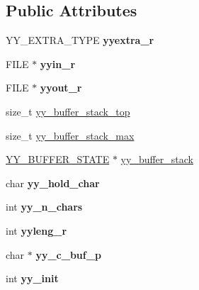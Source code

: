 \subsection*{Public Attributes}
\begin{DoxyCompactItemize}
\item 
\mbox{\label{structyyguts__t_aef05c0d6725a5214f6b30466f0b01c47}} 
Y\+Y\+\_\+\+E\+X\+T\+R\+A\+\_\+\+T\+Y\+PE {\bfseries yyextra\+\_\+r}
\item 
\mbox{\label{structyyguts__t_a21f81ca100b12364a5095a37d1c6f650}} 
F\+I\+LE $\ast$ {\bfseries yyin\+\_\+r}
\item 
\mbox{\label{structyyguts__t_a436368a905aaf12e809e265749c74031}} 
F\+I\+LE $\ast$ {\bfseries yyout\+\_\+r}
\item 
size\+\_\+t \mbox{\hyperlink{structyyguts__t_af92507d904af2fcd4509acde654a9850}{yy\+\_\+buffer\+\_\+stack\+\_\+top}}
\item 
size\+\_\+t \mbox{\hyperlink{structyyguts__t_a4435bb91e87f9988b096afc21386289a}{yy\+\_\+buffer\+\_\+stack\+\_\+max}}
\item 
\mbox{\hyperlink{structyy__buffer__state}{Y\+Y\+\_\+\+B\+U\+F\+F\+E\+R\+\_\+\+S\+T\+A\+TE}} $\ast$ \mbox{\hyperlink{structyyguts__t_ad0b9d576189d518a4482f20ed9b2a416}{yy\+\_\+buffer\+\_\+stack}}
\item 
\mbox{\label{structyyguts__t_adde3f71374c223bbac47284824996e86}} 
char {\bfseries yy\+\_\+hold\+\_\+char}
\item 
\mbox{\label{structyyguts__t_a99c9218941829a6662d358422fd4184a}} 
int {\bfseries yy\+\_\+n\+\_\+chars}
\item 
\mbox{\label{structyyguts__t_aba739bc731f0e9cbb0b6bdfca7930ebd}} 
int {\bfseries yyleng\+\_\+r}
\item 
\mbox{\label{structyyguts__t_ab1b9bcacb33aab1e02b625512bc0e221}} 
char $\ast$ {\bfseries yy\+\_\+c\+\_\+buf\+\_\+p}
\item 
\mbox{\label{structyyguts__t_abbef56b2d8359f6a15629c104f5dd030}} 
int {\bfseries yy\+\_\+init}
\item 

\end{DoxyCompactItemize}
